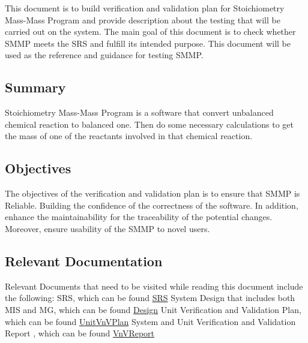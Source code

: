 \documentclass[12pt, titlepage]{article}
\begin{document}
This document is to build verification and validation plan for Stoichiometry Mass-Mass Program and provide description about the testing that will be carried out on the system. The main goal of this document is to check whether SMMP meets the SRS and fulfill its intended purpose. This document will be used as the reference and guidance for testing SMMP.

\subsection{Summary}

Stoichiometry Mass-Mass Program is a software that convert unbalanced chemical reaction to balanced one. Then do some necessary calculations to get the mass of one of the reactants involved in that chemical reaction.

\subsection{Objectives}

The objectives of the verification and validation plan is to ensure that SMMP is Reliable. Building the confidence of the correctness of the software. In addition, enhance the maintainability for the traceability of the potential changes. Moreover, ensure usability of the SMMP to novel users. 

\subsection{Relevant Documentation}

Relevant Documents that need to be visited while reading this document include the following:
\newline
SRS, which can be found  \href{https://github.com/deemaalomair1/CAS741_project/tree/master/docs/SRS}{SRS} \cite{SoftwareSpecification}
\newline
System Design that includes both MIS and MG, which can be found \href{https://github.com/deemaalomair1/CAS741project/tree/master/docs/Design}{Design} \cite{Designdocument}
\newline
Unit Verification and Validation Plan,  which can be found \href{https://github.com/deemaalomair1/CAS741project/tree/master/docs/VnVPlan/UnitVnVPlan}{UnitVnVPlan} \cite{UnitVnVPlan}
\newline
System and Unit Verification and Validation Report ,  which can be found \href{https://github.com/deemaalomair1/CAS741project/tree/master/docs/VnVReport}{VnVReport} \cite{VnVReport}
\end{document}

